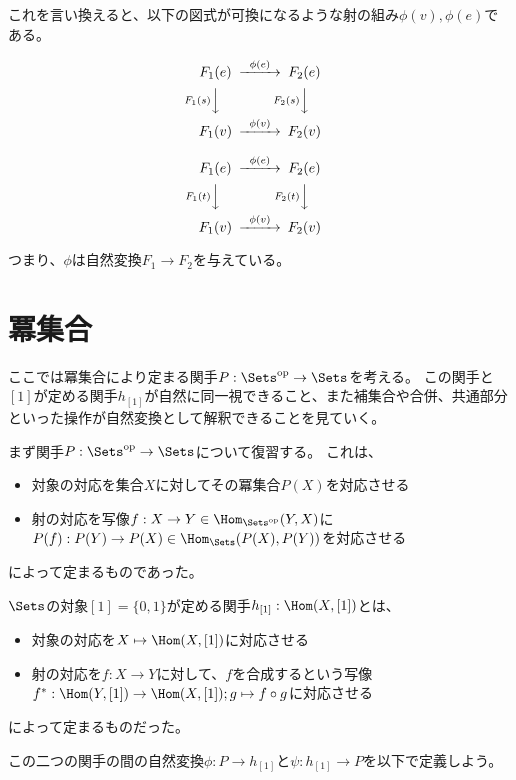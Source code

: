 \documentclass{jsarticle}
\begin{document}
これを言い換えると、以下の図式が可換になるような射の組み$\phi(v), \phi(e)$である。
\begin{multicols}{2}
\begin{align*}
\begin{CD}
F_1(e)@>\phi(e)>>F_2(e)\\
@VF_1(s)VV@VF_2(s)VV\\
F_1(v)@>\phi(v)>>F_2(v)
\end{CD}
\end{align*}

\begin{align*}
\begin{CD}
F_1(e)@>\phi(e)>>F_2(e)\\
@VF_1(t)VV@VF_2(t)VV\\
F_1(v)@>\phi(v)>>F_2(v)
\end{CD}
\end{align*}
\end{multicols}
つまり、$\phi$は自然変換$F_1 \to F_2$を与えている。

\section{冪集合}
ここでは冪集合により定まる関手$P:\Sets^{\rm op}\to\Sets$を考える。
この関手と$[1]$が定める関手$h_{[1]}$が自然に同一視できること、また補集合や合併、共通部分といった操作が自然変換として解釈できることを見ていく。

\vspace{10pt}

まず関手$P:\Sets^{\rm op}\to\Sets$について復習する。
これは、
\begin{itemize}
\item 対象の対応を集合$X$に対してその冪集合$P(X)$を対応させる
\item 射の対応を写像$f:X\to Y\in\Hom_{\Sets^{\rm op}}(Y,X)$に$P(f):P(Y)\to P(X)\in\Hom_{\Sets}(P(X),P(Y))$を対応させる
\end{itemize}
によって定まるものであった。

$\Sets$の対象$[1]=\{0,1\}$が定める関手$h_{[1]}:\Hom(X,[1])$とは、
\begin{itemize}
\item 対象の対応を$X \mapsto \Hom(X,[1])$に対応させる
\item 射の対応を$f:X \to Y$に対して、$f$を合成するという写像$f^*:\Hom(Y,[1]) \to \Hom(X,[1]);g \mapsto f\circ g$に対応させる
\end{itemize}
によって定まるものだった。

この二つの関手の間の自然変換$\phi:P \to h_{[1]}$と$\psi:h_{[1]} \to P$を以下で定義しよう。
\end{document}
